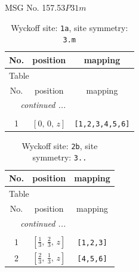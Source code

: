 \documentclass[fleqn,8pt]{jsarticle}
\begin{document}
\setcounter{MaxMatrixCols}{32}

\renewcommand{\tablename}{Table~}
\renewcommand{\figurename}{Figure~}
\begin{center}
\LARGE
MSG No. 157.53\quad$P31m$
\end{center}
\renewcommand{\arraystretch}{1.2}
\begin{longtable}{ccc}
\caption{Wyckoff site: {\tt 1a}, site symmetry: {\tt 3.m}}
 \\
 \hline \hline
No. & position & mapping \\ \hline \endfirsthead

\multicolumn{2}{l}{\tablename\ \thetable{}} \\
 \hline \hline
No. & position & mapping \\ \hline \endhead

 \hline \hline
\multicolumn{2}{r}{\footnotesize\it continued ...} \\ \endfoot

 \hline \hline
\multicolumn{2}{r}{} \\ \endlastfoot

1 & $\left[ 0,\, 0,\, z \right]$ & {\tt [1,2,3,4,5,6]} \\
\end{longtable}
\renewcommand{\arraystretch}{1.2}
\begin{longtable}{ccc}
\caption{Wyckoff site: {\tt 2b}, site symmetry: {\tt 3..}}
 \\
 \hline \hline
No. & position & mapping \\ \hline \endfirsthead

\multicolumn{2}{l}{\tablename\ \thetable{}} \\
 \hline \hline
No. & position & mapping \\ \hline \endhead

 \hline \hline
\multicolumn{2}{r}{\footnotesize\it continued ...} \\ \endfoot

 \hline \hline
\multicolumn{2}{r}{} \\ \endlastfoot

1 & $\left[ \frac{1}{3},\, \frac{2}{3},\, z \right]$ & {\tt [1,2,3]} \\ \hline
2 & $\left[ \frac{2}{3},\, \frac{1}{3},\, z \right]$ & {\tt [4,5,6]} \\
\end{longtable}
\renewcommand{\arraystretch}{1.2}
\end{document}
